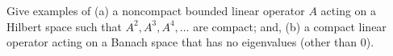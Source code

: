 Give examples of (a) a noncompact bounded linear operator $A$ acting
on a Hilbert space such that $A^2,A^3,A^4,\ldots $ are compact; and,
(b) a compact linear operator acting on a Banach space that has no
eigenvalues (other than $0$).

